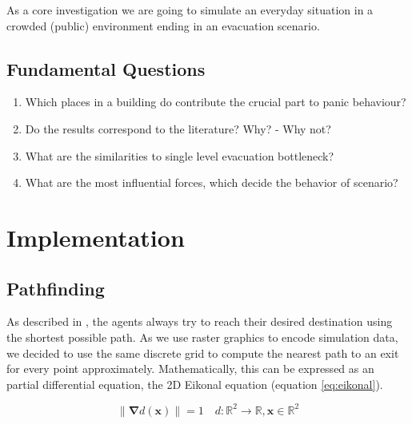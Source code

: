 \documentclass[11pt]{article}
\begin{document}
As a core investigation we are going to simulate an everyday situation in a crowded (public) environment ending in an evacuation scenario.

\subsection{Fundamental Questions}

\begin{enumerate}
\item Which places in a building do contribute the crucial part to panic behaviour?
\item Do the results correspond to the literature? Why? - Why not?
\item What are the similarities to single level evacuation bottleneck?
\item What are the most influential forces, which decide the behavior of scenario?

 
\end{enumerate}





\section{Implementation}


\subsection{Pathfinding}
As described in \cite{SFMPD}, the agents always try to reach their desired destination using the shortest possible path. As we use raster graphics to encode simulation data, we decided to use the same discrete grid to compute the nearest path to an exit for every point approximately.
Mathematically, this can be expressed as an partial differential equation, the 2D Eikonal equation (equation \ref{eq:eikonal}).

\begin{equation} \label{eq:eikonal}
\|\mathbf{\nabla} d(\mathbf{x})\|=1 \quad d:\!\mathbb{R}^{2}\to\mathbb{R},\mathbf{x}\in\mathbb{R}^{2}
\end{equation}
\end{document}
